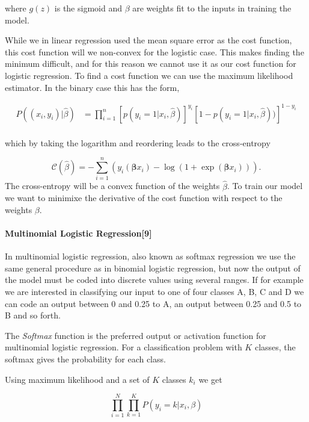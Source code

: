 \documentclass[11pt]{article}
\begin{document}
where \(g(z)\) is the sigmoid and \(\beta\) are weights fit to the
inputs in training the model.

While we in linear regression used the mean square error as the cost
function, this cost function will we non-convex for the logistic case.
This makes finding the minimum difficult, and for this reason we cannot
use it as our cost function for logistic regression. To find a cost
function we can use the maximum likelihood estimator. In the binary case
this has the form,


\begin{align*}
P((x_i,y_i)|\hat{\beta})& = \prod_{i=1}^n \left[p(y_i=1|x_i,\hat{\beta})\right]^{y_i}\left[1-p(y_i=1|x_i,\hat{\beta}))\right]^{1-y_i}\nonumber \\
\end{align*}


which by taking the logarithm and reordering leads to the cross-entropy

\[
\mathcal{C}(\hat{\beta})=-\sum_{i=1}^n  \left(y_i(\boldsymbol{\beta}x_i) -\log{(1+\exp{(\boldsymbol{\beta}x_i)})}\right).
\] The cross-entropy will be a convex function of the weights
\(\hat{\beta}\). To train our model we want to minimixe the derivative
of the cost function with respect to the weights \(\beta\).

    \hypertarget{multinomial-logistic-regression9}{%
\paragraph{Multinomial Logistic
Regression{[}9{]}}\label{multinomial-logistic-regression9}}

In multinomial logistic regression, also known as softmax regression we
use the same general procedure as in binomial logistic regression, but
now the output of the model must be coded into discrete values using
several ranges. If for example we are interested in classifying our
input to one of four classes A, B, C and D we can code an output between
0 and 0.25 to A, an output between 0.25 and 0.5 to B and so forth.

The \emph{Softmax} function is the preferred output or activation
function for multinomial logistic regression. For a classification
problem with \(K\) classes, the softmax gives the probability for each
class.

Using maximum likelihood and a set of \(K\) classes \(k_i\) we get

\[
\prod_{i=1}^N\prod_{k=1}^K P(y_i=k|x_i,\beta)
\]
\end{document}
